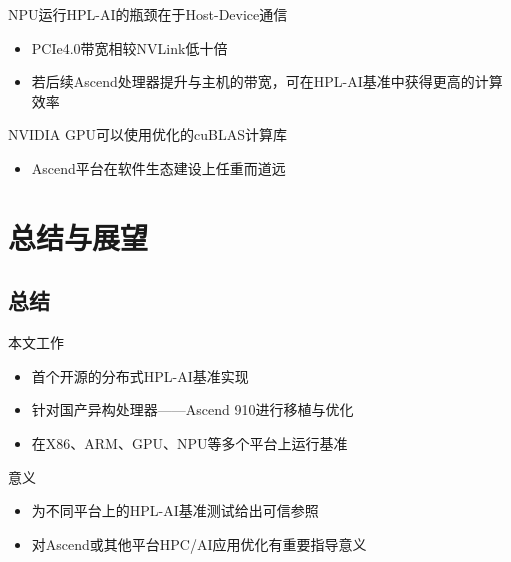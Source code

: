 \documentclass[
    fontset=fandol,
    xcolor=svgnames %
]{ctexbeamer}
\begin{document}
\begin{frame}

    \begin{block}{NPU运行HPL-AI的瓶颈在于Host-Device通信}
        \begin{itemize}
            \item PCIe4.0带宽相较NVLink低十倍
            \item 若后续Ascend处理器提升与主机的带宽，可在HPL-AI基准中获得更高的计算效率
        \end{itemize}
    \end{block}
    \begin{block}{NVIDIA GPU可以使用优化的cuBLAS计算库}
        \begin{itemize}
            \item Ascend平台在软件生态建设上任重而道远
        \end{itemize}
    \end{block}

\end{frame}

\section{总结与展望}
\subsection{总结}
\begin{frame}
    \begin{block}{本文工作}
        \begin{itemize}
            \item 首个开源的分布式HPL-AI基准实现
            \item 针对国产异构处理器——Ascend 910进行移植与优化
            \item 在X86、ARM、GPU、NPU等多个平台上运行基准
        \end{itemize}
    \end{block}
    \begin{block}{意义}
        \begin{itemize}
            \item 为不同平台上的HPL-AI基准测试给出可信参照
            \item 对Ascend或其他平台HPC/AI应用优化有重要指导意义
        \end{itemize}
    \end{block}
\end{frame}
\end{document}
